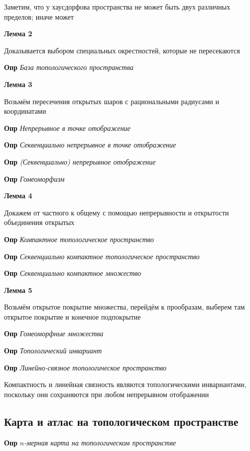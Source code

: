 \documentclass[a4paper, 14pt]{article}
\begin{document}
    Заметим, что у хаусдорфова пространства не может быть двух различных пределов; иначе может
    
    \textbf{Лемма 2}
    
    Доказывается выбором специальных окрестностей, которые не пересекаются
    
    \textbf{Опр} \textit{База топологического пространства}
    
    \textbf{Лемма 3}
    
    Возьмём пересечения открытых шаров с рациональными радиусами и координатами
    
    \textbf{Опр} \textit{Непрерывное в точке отображение}
    
    \textbf{Опр} \textit{Секвенциально непрерывное в точке отображение}
    
    \textbf{Опр} \textit{(Секвенциально) непрерывное отображение}
    
    \textbf{Опр} \textit{Гомеоморфизм}
    
    \textbf{Лемма 4}
    
    Докажем от частного к общему с помощью непрерывности и открытости объединения открытых
    
    \textbf{Опр} \textit{Компактное топологическое пространство}
    
    \textbf{Опр} \textit{Секвенциально компактное топологическое пространство}
    
    \textbf{Опр} \textit{Секвенциально компактное множество}
    
    \textbf{Лемма 5}
    
    Возьмём открытое покрытие множества, перейдём к прообразам, выберем там открытое покрытие и конечное подпокрытие
    
    \textbf{Опр} \textit{Гомеоморфные множества}
    
    \textbf{Опр} \textit{Топологический инвариант}
    
    \textbf{Опр} \textit{Линейно-связное топологическое пространство}
    
    Компактность и линейная связность являются топологическими инвариантами, поскольку они сохраняются при любом
    непрерывном отображении
    
    \subsection{Карта и атлас на топологическом пространстве}
    
    \textbf{Опр} \textit{$n$-мерная карта на топологическом пространстве}
    
\end{document}
